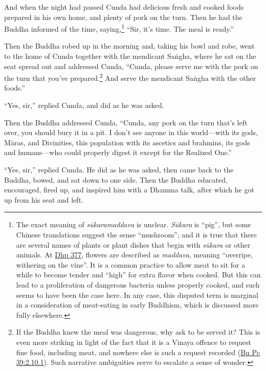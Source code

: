 \documentclass[12pt,openany]{book}%
\begin{document}
And when the night had passed Cunda had delicious fresh and cooked foods prepared in his own home, and plenty of pork on the turn. Then he had the Buddha informed of the time, saying,\footnote{The exact meaning of \textit{\textsanskrit{sūkaramaddava}} is unclear. \textit{\textsanskrit{Sūkara}} is “pig”, but some Chinese translations suggest the sense “mushroom”; and it is true that there are several names of plants or plant dishes that begin with \textit{\textsanskrit{sūkara}} or other animals. At \href{https://suttacentral.net/dhp377/en/sujato}{Dhp 377}, flowers are described as \textit{maddava}, meaning “overripe, withering on the vine”. It is a common practice to allow meat to sit for a while to become tender and “high” for extra flavor when cooked. But this can lead to a proliferation of dangerous bacteria unless properly cooked, and such seems to have been the case here. In any case, this disputed term is marginal in a consideration of meat-eating in early Buddhism, which is discussed more fully elsewhere. } “Sir, it’s time. The meal is ready.” 

Then the Buddha robed up in the morning and, taking his bowl and robe, went to the home of Cunda together with the mendicant \textsanskrit{Saṅgha}, where he sat on the seat spread out and addressed Cunda, “Cunda, please serve me with the pork on the turn that you’ve prepared.\footnote{If the Buddha knew the meal was dangerous, why ask to be served it? This is even more striking in light of the fact that it is a Vinaya offence to request fine food, including meat, and nowhere else is such a request recorded (\href{https://suttacentral.net/pli-tv-bu-vb-pc39/en/sujato\#2.10.1}{Bu Pc 39:2.10.1}). Such narrative ambiguities serve to escalate a sense of wonder. } And serve the mendicant \textsanskrit{Saṅgha} with the other foods.” 

“Yes, sir,” replied Cunda, and did as he was asked. 

Then the Buddha addressed Cunda, “Cunda, any pork on the turn that’s left over, you should bury it in a pit. I don’t see anyone in this world—with its gods, \textsanskrit{Māras}, and Divinities, this population with its ascetics and brahmins, its gods and humans—who could properly digest it except for the Realized One.” 

“Yes, sir,” replied Cunda. He did as he was asked, then came back to the Buddha, bowed, and sat down to one side. Then the Buddha educated, encouraged, fired up, and inspired him with a Dhamma talk, after which he got up from his seat and left. 
\end{document}
